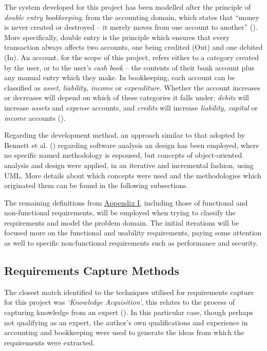 The system developed for this project has been modelled after the principle of
\emph{double entry bookkeeping}, from the accounting domain, which states that
``money is never created or destroyed -- it merely moves from one account to
another'' (\cite[][Section 6.2]{fowler1997analysis}). More specifically, double
entry is the principle which ensures that every transaction always affects two
accounts, one being credited (Out) and one debited (In). An account, for the
scope of this project, refers either to a category created by the user, or to
the user's \emph{cash book} -- the contents of their bank account plus any
manual entry which they make. In bookkeeping, each account can be classified as
\emph{asset, liability, income} or \emph{expenditure}. Whether the account
increases or decreases will depend on which of these categories it falls under:
\emph{debits} will increase \emph{assets} and \emph{expense} accounts, and
\emph{credits} will increase \emph{liability, capital} or \emph{income}
accounts (\cite[][pp.~18-19]{wood2004book}).


Regarding the development method, an approach similar to that adopted by
Bennett et al.  (\citeyear[][p.~77]{bennett2010object}) regarding software
analysis an design has been employed, where no specific named methodology is
espoused, but concepts of object-oriented analysis and design were applied, in
an iterative and incremental fashion, using UML. More details about which
concepts were used and the methodologies which originated them can be found in
the following subsections.


The remaining definitions from \hyperref[appendix1]{Appendix I}, including
those of functional and non-functional requirements, will be employed when
trying to classify the requirements and model the problem domain. The initial
iterations will be focused more on the functional and usability requirements,
paying some attention as well to specific non-functional requirements such as
performance and security.


\subsection{Requirements Capture Methods} \label{sec:DevelopmentMethod.RequirementsCapture}
The closest match identified to the techniques utilised for requirements
capture for this project was \emph{`Knowledge Acquisition'}, this relates to
the process of capturing knowledge from an expert
(\cite[][p.~150]{bennett2010object}). In this particular case, though perhaps
not qualifying as an expert, the author's own qualifications and experience in
accounting and bookkeeping were used to generate the ideas from which the
requirements were extracted.

